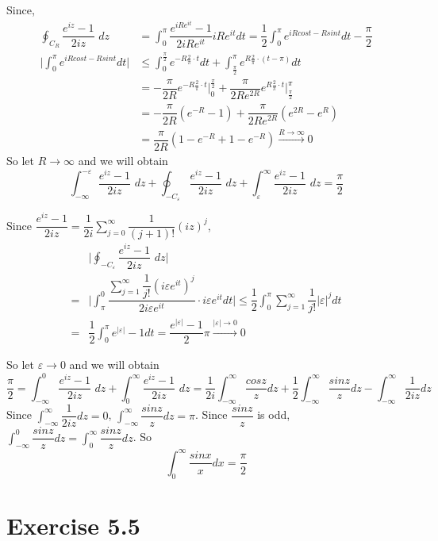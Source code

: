 \documentclass[a4paper,12pt,titlepage]{article}
\begin{document}
Since, 
\begin{align*}
\oint_{C_{R}}\dfrac{e^{iz}-1}{2iz}\,\,dz&= \int_0^{\pi}\dfrac{e^{iRe^{it}}-1}{2iRe^{it}}iRe^{it}dt=\dfrac{1}{2}\int_0^{\pi}e^{iRcost-Rsint}dt-\dfrac{\pi}{2}\\
\Big|\int_0^{\pi}e^{iRcost-Rsint}dt\Big|&\leqslant \int_0^{\frac{\pi}{2}}e^{-R\frac{2}{\pi}\cdot t}dt+\int_{\frac{\pi}{2}}^{\pi}e^{R\frac{2}{\pi}\cdot (t-\pi)}dt\\
&=-\dfrac{\pi}{2R}e^{-R\frac{2}{\pi}\cdot t}\Big|_0^{\frac{\pi}{2}}+\dfrac{\pi}{2Re^{2R}}e^{R\frac{2}{\pi}\cdot t}\Big|^{\pi}_{\frac{\pi}{2}}\\
&=-\dfrac{\pi}{2R}(e^{-R}-1)+\dfrac{\pi}{2Re^{2R}}(e^{2R}-e^R)\\
&=\dfrac{\pi}{2R}(1-e^{-R}+1-e^{-R})\overset{R\rightarrow\infty}{\longrightarrow}0
\end{align*}
So let $R\rightarrow\infty$ and we will obtain
$$\int_{-\infty}^{-\varepsilon}\dfrac{e^{iz}-1}{2iz}\,\,dz+\oint_{-C_{\varepsilon}}\dfrac{e^{iz}-1}{2iz}\,\,dz+\int^{\infty}_{\varepsilon}\dfrac{e^{iz}-1}{2iz}\,\,dz=\dfrac{\pi}{2}$$

Since $\dfrac{e^{iz}-1}{2iz}=\dfrac{1}{2i}\sum\limits_{j=0}^{\infty}\dfrac{1}{(j+1)!}(iz)^j$,
\begin{align*}
&\Big|\oint_{-C_{\varepsilon}}\dfrac{e^{iz}-1}{2iz}\,\,dz\Big|\\
=&\Big|\int^0_{\pi}\dfrac{\sum\limits_{j=1}^{\infty}\dfrac{1}{j!}(i\varepsilon e^{it})^j}{2i\varepsilon e^{it}}\cdot i\varepsilon e^{it}dt\Big|\leqslant\dfrac{1}{2}\int_0^{\pi}\sum\limits_{j=1}^{\infty}\dfrac{1}{j!}|\varepsilon|^jdt\\
=&\dfrac{1}{2}\int_0^{\pi}e^{|\varepsilon|}-1dt=\dfrac{e^{|\varepsilon|}-1}{2}\pi\overset{|\varepsilon|\rightarrow0}{\longrightarrow}0
\end{align*}

So let $\varepsilon\rightarrow0$ and we will obtain
$$\dfrac{\pi}{2}=\int_{-\infty}^{0}\dfrac{e^{iz}-1}{2iz}\,\,dz+\int^{\infty}_{0}\dfrac{e^{iz}-1}{2iz}\,\,dz=\dfrac{1}{2i}\int_{-\infty}^{\infty}\dfrac{cosz}{z}dz+\dfrac{1}{2}\int_{-\infty}^{\infty}\dfrac{sinz}{z}dz-\int_{-\infty}^{\infty}\dfrac{1}{2iz}dz$$
Since $\int_{-\infty}^{\infty}\dfrac{1}{2iz}dz=0$, $\int_{-\infty}^{\infty}\dfrac{sinz}{z}dz=\pi$. Since $\dfrac{sinz}{z}$ is odd, $\int_{-\infty}^{0}\dfrac{sinz}{z}dz=\int_{0}^{\infty}\dfrac{sinz}{z}dz$. So 
$$\int_{0}^{\infty}\dfrac{sinx}{x}dx=\dfrac{\pi}{2}$$


\section*{Exercise 5.5}
\end{document}
